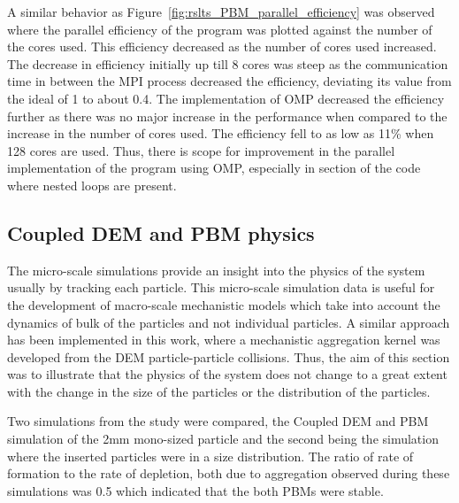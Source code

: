 \documentclass[preprint,11pt,authoryear]{elsarticle}
\begin{document}
A similar behavior as Figure~\ref{fig:rslts_PBM_parallel_efficiency} was observed where the parallel 
efficiency of the program was plotted against the number of the cores used. This efficiency 
decreased as the number of cores used increased. The decrease in efficiency initially up till 8 cores 
was steep as the communication time in between the MPI process decreased the efficiency, deviating 
its value from the ideal of 1 to about 0.4. The implementation of OMP decreased the efficiency further 
as there was no major increase in the performance when compared to the increase in the number 
of cores used. The efficiency fell to as low as 11\% when 128 cores are used. 
Thus, there is scope for improvement in the parallel implementation 
of the program using OMP, especially in section of the code where nested loops are present.


\subsection{Coupled DEM and PBM physics}
The micro-scale simulations provide an insight into the physics of the system usually by tracking 
each particle. This micro-scale simulation data is useful for the development of macro-scale 
mechanistic models which take into account the dynamics of bulk of the particles and not individual 
particles. A similar approach has been implemented in this work, where a mechanistic aggregation 
kernel was developed from the DEM particle-particle collisions. Thus, the aim of this section was to 
illustrate that the physics of the system does not change to a great extent with the change in the size 
of the particles or the distribution of the particles.

Two simulations from the study were compared, the Coupled DEM and PBM simulation of the 2mm 
mono-sized particle and the second being the simulation where the inserted particles were in a size 
distribution. The ratio of rate of formation to the rate of depletion, both due to aggregation 
observed during these simulations was 0.5 which indicated that the both PBMs were stable.
\end{document}

